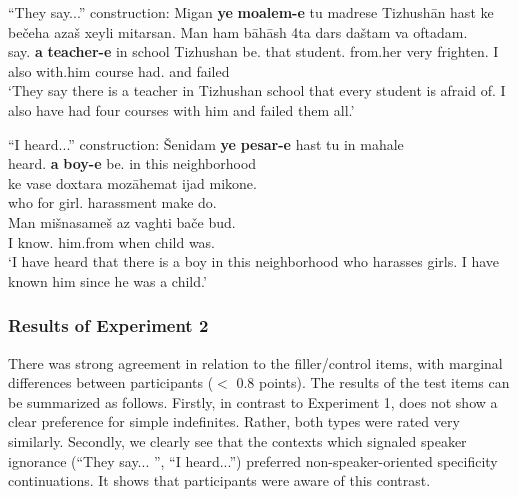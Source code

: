 \documentclass[output=paper]{langsci/langscibook}
\begin{document}
\begin{exe}
\ex\label{4ex:35}
``They say...'' construction:
\exi{}
\gll	Migan {\bf{ye}} {\bf{moalem-e}} tu madrese Tizhushān hast ke bečeha azaš xeyli mitarsan. Man ham bāhāsh 4ta dars daštam va oftadam. \\
	say.{} {\bf{a}} {\bf{teacher-e}} in school Tizhushan be.{} that	 student.{} from.her very frighten.{} I also with.him {} course had.{} and failed \\
\glt	`They say there is a teacher in Tizhushan school that every student is afraid of. I also have had four courses with him and failed them all.'

\ex\label{4ex:36}
``I heard...'' construction:
\exi{}
\gll Šenidam {\bf{ye}} {\bf{pesar-e}} hast tu in mahale \\
heard.{} {\bf{a}} {\bf{boy-e}} be.{} in this neighborhood \\
\glt
\exi{}
\gll ke vase doxtara mozāhemat ijad mikone. \\
who for girl.{} harassment make do.{} \\
\glt
\exi{}
\gll Man mišnasameš az vaghti bače bud. \\
I know.{} him.from when child was.{} \\
\glt `I have heard that there is a boy in this neighborhood who harasses girls. I have known him since he was a child.'


\end{exe}

\subsubsection{Results of Experiment 2}\label{4sec:522}
There was strong agreement in relation to the filler/control items, with marginal differences between participants ($<$ 0.8 points). The results of the test items can be summarized as follows. Firstly, in contrast to Experiment 1,  does not show a clear preference for simple indefinites. Rather, both types were rated very similarly. Secondly, we clearly see that the contexts which signaled speaker ignorance (``They say... '', ``I heard...'') preferred non-speaker-oriented specificity continuations. It shows that participants were aware of this contrast.
\end{document}
